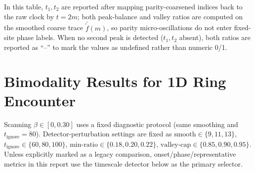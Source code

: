 \documentclass[11pt]{article}
\newcommand{\TabDir}{tables}
\begin{document}


\begin{table}[H]
  \centering
  \caption{Fixed-site example metrics.}
  
\end{table}
In this table, $t_1,t_2$ are reported after mapping parity-coarsened indices back to the raw clock by $t=2m$;
both peak-balance and valley ratios are computed on the smoothed coarse trace $\bar{\widetilde f}(m)$, so parity micro-oscillations do not enter fixed-site phase labels.
When no second peak is detected ($t_1,t_2$ absent), both ratios are reported as ``--'' to mark the values as undefined rather than numeric 0/1.

\section{Bimodality Results for 1D Ring Encounter}
Scanning $\beta\in[0,0.30]$ uses a fixed diagnostic protocol (same smoothing and $t_{\mathrm{ignore}}=80$).
Detector-perturbation settings are fixed as
$\text{smooth}\in\{9,11,13\}$,
$t_{\mathrm{ignore}}\in\{60,80,100\}$,
$\text{min-ratio}\in\{0.18,0.20,0.22\}$,
$\text{valley-cap}\in\{0.85,0.90,0.95\}$.
Unless explicitly marked as a legacy comparison, onset/phase/representative metrics in this report use the timescale detector below as the primary selector.
\end{document}
